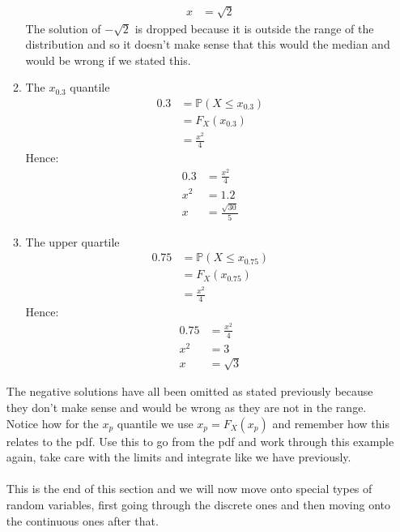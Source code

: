 \documentclass[,oneside]{article}
\begin{document}
\begin{enumerate}
\begin{enumerate}
\begin{align*}
x &= \sqrt{2}
\end{align*}
The solution of $-\sqrt{2}$ is dropped because it is outside the range of the distribution and so it doesn't make sense that this would the median and would be wrong if we stated this.
\item The $x_{0.3}$ quantile 
\begin{align*}
0.3 &= \mathbb{P}(X \leq x_{0.3})\\
&= F_X(x_{0.3})\\
&= \frac{x^2}{4}
\end{align*}
Hence:
\begin{align*}
0.3 &= \frac{x^2}{4}\\
x^2 &= 1.2\\
x &= \frac{\sqrt{30}}{5}
\end{align*}
\item The upper quartile
\begin{align*}
0.75 &= \mathbb{P}(X \leq x_{0.75})\\
&= F_X(x_{0.75})\\
&= \frac{x^2}{4}
\end{align*}
Hence:
\begin{align*}
0.75 &= \frac{x^2}{4}\\
x^2 &= 3\\
x &= \sqrt{3}
\end{align*}
\end{enumerate}
The negative solutions have all been omitted as stated previously because they don't make sense and would be wrong as they are not in the range. Notice how for the $x_p$ quantile we use $x_p = F_X(x_p)$ and remember how this relates to the pdf. Use this to go from the pdf and work through this example again, take care with the limits and integrate like we have previously. \\ \\
This is the end of this section and we will now move onto special types of random variables, first going through the discrete ones and then moving onto the continuous ones after that.



\end{enumerate}
\end{document}
